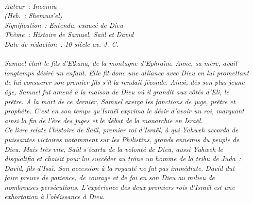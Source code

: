 \BFont
\noindent\hrulefill
{\footnotesize
\textit{
\bigskip
{\centering{}
\\Auteur~: Inconnu
\\(Heb.~: Shemuw'el)
\\Signification~: Entendu, exaucé de Dieu
\\Thème~: Histoire de Samuel, Saül et David
\\Date de rédaction~: 10 siècle av. J.-C.\\}
}
\textit{
\\Samuel était le fils d'Elkana, de la montagne d'Ephraïm. Anne, sa mère, avait longtemps désiré un enfant. Elle fit donc une alliance avec Dieu en lui promettant de lui consacrer son premier fils s'il la rendait féconde. Ainsi, dès son plus jeune âge, Samuel fut amené à la maison de Dieu où il grandit aux côtés d'Eli, le prêtre. A la mort de ce dernier, Samuel exerça les fonctions de juge, prêtre et prophète. C'est en son temps qu'Israël exprima le désir d'avoir un roi, marquant ainsi la fin de l'ère des juges et le début de la monarchie en Israël.
\\Ce livre relate l'histoire de Saül, premier roi d'Israël, à qui Yahweh accorda de puissantes victoires notamment sur les Philistins, grands ennemis du peuple de Dieu. Mais très vite, Saül s'écarta de la volonté de Dieu, aussi Yahweh le disqualifia et choisit pour lui succéder au trône un homme de la tribu de Juda~: David, fils d'Isaï. Son accession à la royauté ne fut pas immédiate. David dut faire preuve de patience, de courage et de foi en son Dieu au milieu de nombreuses persécutions. L'expérience des deux premiers rois d'Israël est une exhortation à l'obéissance à Dieu.\bigskip
}
}
\par\nobreak\noindent\hrulefill
